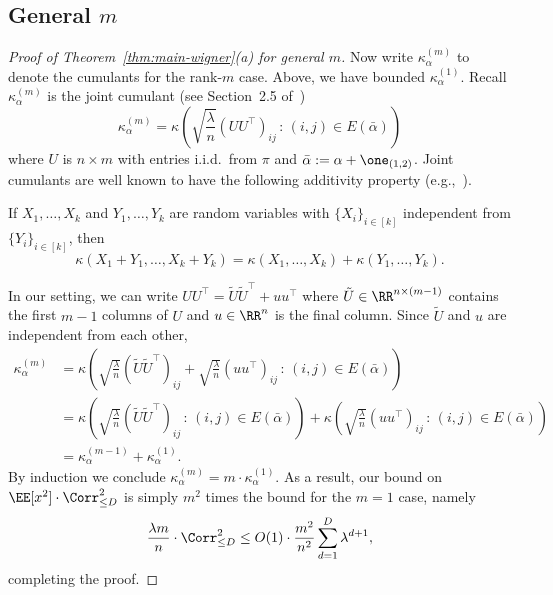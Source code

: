 \documentclass[11pt]{article}
\begin{document}
\subsection{General $m$}

\begin{proof}[Proof of Theorem~\ref{thm:main-wigner}(a) for general $m$]
Now write $\kappa^{(m)}_\alpha$ to denote the cumulants for the rank-$m$ case. Above, we have bounded $\kappa^{(1)}_\alpha$.  Recall $\kappa^{(m)}_\alpha$ is the joint cumulant (see Section~2.5 of~\cite{SW-estimation})
\[ \kappa^{(m)}_\alpha = \kappa\left(\sqrt{\frac{\lambda}{n}} (UU^\top)_{ij} \,:\, (i,j) \in E(\bar\alpha)\right) \]
where $U$ is $n \times m$ with entries i.i.d.\ from $\pi$ and $\bar\alpha := \alpha + \one_{(1,2)}$. Joint cumulants are well known to have the following additivity property (e.g.,~\cite[Proposition~2.12]{SW-estimation}).

\begin{proposition}
If $X_1,\ldots,X_k$ and $Y_1,\ldots,Y_k$ are random variables with $\{X_i\}_{i \in [k]}$ independent from $\{Y_i\}_{i \in [k]}$, then
\[ \kappa(X_1+Y_1,\ldots,X_k+Y_k) = \kappa(X_1,\ldots,X_k) + \kappa(Y_1,\ldots,Y_k). \]
\end{proposition}

In our setting, we can write $UU^\top = \tilde{U}\tilde{U}^\top + uu^\top$ where $\tilde{U} \in \RR^{n \times (m-1)}$ contains the first $m-1$ columns of $U$ and $u \in \RR^n$ is the final column. Since $\tilde{U}$ and $u$ are independent from each other,
\begin{align*}
\kappa^{(m)}_\alpha &= \kappa\left(\sqrt{\frac{\lambda}{n}} (\tilde{U}\tilde{U}^\top)_{ij} + \sqrt{\frac{\lambda}{n}}(uu^\top)_{ij} \,:\, (i,j) \in E(\bar\alpha)\right) \\
&= \kappa\left(\sqrt{\frac{\lambda}{n}} (\tilde{U}\tilde{U}^\top)_{ij} \,:\, (i,j) \in E(\bar\alpha)\right) + \kappa\left(\sqrt{\frac{\lambda}{n}}(uu^\top)_{ij} \,:\, (i,j) \in E(\bar\alpha)\right) \\
&= \kappa^{(m-1)}_\alpha + \kappa^{(1)}_\alpha.
\end{align*}
By induction we conclude $\kappa^{(m)}_\alpha = m \cdot \kappa^{(1)}_\alpha$. As a result, our bound on $\EE[x^2] \cdot \Corr_{\le D}^2$ is simply $m^2$ times the bound for the $m=1$ case, namely
\[ \frac{\lambda m}{n} \cdot \Corr_{\le D}^2 \le O(1) \cdot \frac{m^2}{n^2} \sum_{d=1}^D \lambda^{d+1}, \]
completing the proof.
\end{proof}
\end{document}
